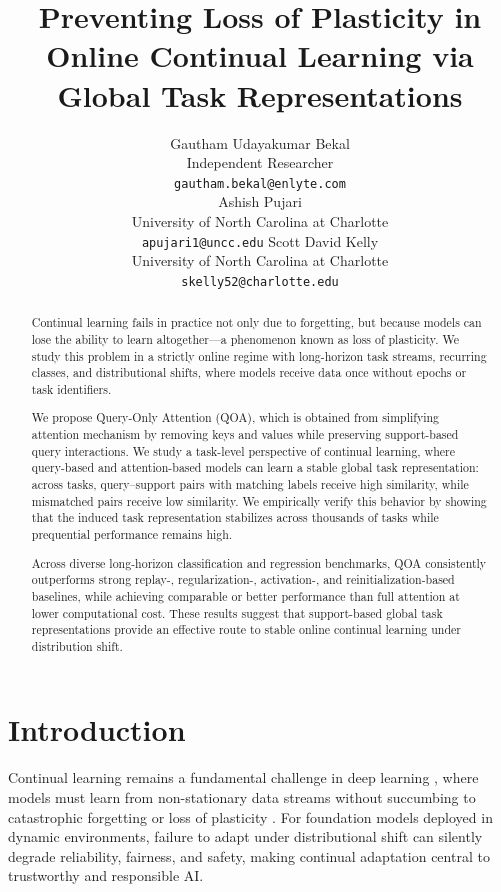 \documentclass{article}
\title{Preventing Loss of Plasticity in Online Continual Learning via Global Task Representations}
\author{
  Gautham Udayakumar Bekal \\
  Independent Researcher \\
  \texttt{gautham.bekal@enlyte.com} \\
  \And
  Ashish Pujari \\
  University of North Carolina at Charlotte \\
  \texttt{apujari1@uncc.edu}
  \And
  Scott David Kelly \\
  University of North Carolina at Charlotte \\
  \texttt{skelly52@charlotte.edu}
}
\begin{document}
\maketitle

\begin{abstract}

Continual learning fails in practice not only due to forgetting, but because models can lose the ability to learn altogether—a phenomenon known as loss of plasticity. We study this problem in a strictly online regime with long-horizon task streams, recurring classes, and distributional shifts, where models receive data once without epochs or task identifiers.

We propose Query-Only Attention (QOA), which is obtained from simplifying attention mechanism by removing keys and values while preserving support-based query interactions. We study a task-level perspective of continual learning, where query-based and attention-based models can learn a stable global task representation: across tasks, query–support pairs with matching labels receive high similarity, while mismatched pairs receive low similarity. We empirically verify this behavior by showing that the induced task representation stabilizes across thousands of tasks while prequential performance remains high.

Across diverse long-horizon classification and regression benchmarks, QOA consistently outperforms strong replay-, regularization-, activation-, and reinitialization-based baselines, while achieving comparable or better performance than full attention at lower computational cost. These results suggest that support-based global task representations provide an effective route to stable online continual learning under distribution shift.

\end{abstract}

\section{Introduction}
Continual learning remains a fundamental challenge in deep learning \citep{wang2024comprehensive}, where models must learn from non-stationary data streams without succumbing to catastrophic forgetting \citep{kirkpatrick2017overcoming} or loss of plasticity \citep{dohare2024loss}.
For foundation models deployed in dynamic environments, failure to adapt under distributional shift can silently degrade reliability, fairness, and safety, making continual adaptation central to trustworthy and responsible AI.
\end{document}

